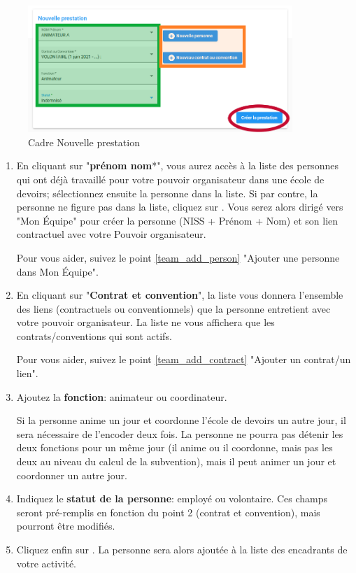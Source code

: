 \begin{figure}[htbp]
    \centering
    \includegraphics[width=10cm]{Images/edd/new_prestation.png}
    \caption{Cadre Nouvelle prestation}
    \label{fig:edd_new_prestation}
\end{figure}


\begin{enumerate}
    \item En cliquant sur "\textbf{prénom nom}*", vous aurez accès à la liste des personnes qui ont déjà travaillé pour votre pouvoir organisateur dans une école de devoirs;  sélectionnez ensuite la personne dans la liste. Si par contre, la personne ne figure pas dans la liste, cliquez sur . Vous serez alors dirigé vers "Mon Équipe" pour créer la personne (NISS + Prénom + Nom) et son lien contractuel avec votre Pouvoir organisateur. 
    \begin{conseil}
     Pour vous aider, suivez le point \ref{team_add_person} "Ajouter une personne dans Mon Équipe".
    \end{conseil}
    
    \item En cliquant sur "\textbf{Contrat et convention}", la liste vous donnera l'ensemble des liens (contractuels ou conventionnels) que la personne entretient avec votre pouvoir organisateur. La liste ne vous affichera que les contrats/conventions qui sont actifs. 
    \begin{conseil}
     Pour vous aider, suivez le point \ref{team_add_contract} "Ajouter un contrat/un lien".
    \end{conseil}    

    
    \item Ajoutez la \textbf{fonction}: animateur ou coordinateur. 
        \begin{attention}
         Si la personne anime un jour et coordonne l'école de devoirs un autre jour, il sera nécessaire de l'encoder deux fois. La personne ne pourra pas détenir les deux fonctions pour un même jour (il anime ou il coordonne, mais pas les deux au niveau du calcul de la subvention), mais il peut animer un jour et coordonner un autre jour.
        \end{attention}
    \item Indiquez le \textbf{statut de la personne}: employé ou volontaire. Ces champs seront pré-remplis en fonction du point 2 (contrat et convention), mais pourront être modifiés. 
    \item Cliquez enfin sur . La personne sera alors ajoutée à la liste des encadrants de votre activité.
\end{enumerate}

